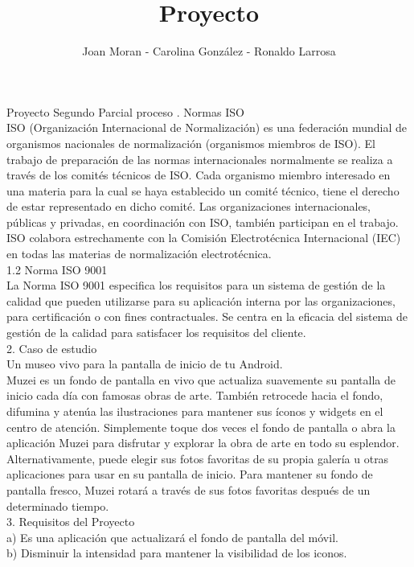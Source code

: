 \documentclass[12pt,a4paper]{article}
\author{Joan Moran - Carolina González - Ronaldo Larrosa}
\title{Proyecto}
\begin{document}
\maketitle Proyecto Segundo Parcial
proceso
.	Normas ISO\\
ISO (Organización Internacional de Normalización) es una federación mundial de organismos nacionales de normalización (organismos miembros de ISO). El trabajo de preparación de las normas internacionales normalmente se realiza a través de los comités técnicos de ISO. Cada organismo miembro interesado en una materia para la cual se haya establecido un comité técnico, tiene el derecho de estar representado en dicho comité. Las organizaciones internacionales, públicas y privadas, en coordinación con ISO, también participan en el trabajo. ISO colabora estrechamente con la Comisión Electrotécnica Internacional (IEC) en todas las materias de normalización electrotécnica.\\

1.2	Norma ISO 9001 \\

La Norma ISO 9001 especifica los requisitos para un sistema de gestión de la calidad que pueden utilizarse para su aplicación interna por las organizaciones, para certificación o con fines contractuales. Se centra en la eficacia del sistema de gestión de la calidad para satisfacer los requisitos del cliente.\\

2.	Caso de estudio\\
Un museo vivo para la pantalla de inicio de tu Android.\\
Muzei es un fondo de pantalla en vivo que actualiza suavemente su pantalla de inicio cada día con famosas obras de arte. También retrocede hacia el fondo, difumina y atenúa las ilustraciones para mantener sus íconos y widgets en el centro de atención. Simplemente toque dos veces el fondo de pantalla o abra la aplicación Muzei para disfrutar y explorar la obra de arte en todo su esplendor.\\

Alternativamente, puede elegir sus fotos favoritas de su propia galería u otras aplicaciones para usar en su pantalla de inicio. Para mantener su fondo de pantalla fresco, Muzei rotará a través de sus fotos favoritas después de un determinado tiempo.\\

3.	Requisitos del Proyecto \\
a)	Es una aplicación que actualizará el fondo de pantalla del móvil.\\
b)	Disminuir la intensidad para mantener la visibilidad de los iconos.\\
\end{document}
